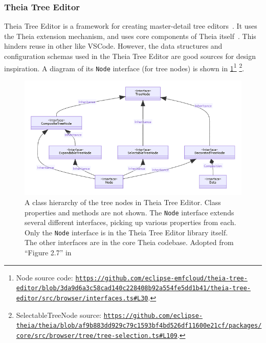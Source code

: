\subsubsection{Theia Tree Editor}\label{par:theia-tree-editor}
Theia Tree Editor is a framework for creating master-detail tree editors~\cite{foundationEMFCloud}.
It uses the Theia extension mechanism, and uses core components of \gls{Theia} itself~\cite{rekstadModelingEnvironmentCloud2020}.
This hinders reuse in other  like \gls{VSCode}.
However, the data structures and configuration schemas used in the Theia Tree Editor are good sources for design inspiration.
A diagram of its \texttt{Node} interface (for tree nodes) is shown in \cref{fig:theia-tree-editor-nodes}\footnote{Node source code: \href{https://github.com/eclipse-emfcloud/theia-tree-editor/blob/3da9d6a3c58cad140c228408b92a554fe5dd1b41/theia-tree-editor/src/browser/interfaces.ts\#L30}{\nolinkurl{https://github.com/eclipse-emfcloud/theia-tree-editor/blob/3da9d6a3c58cad140c228408b92a554fe5dd1b41/theia-tree-editor/src/browser/interfaces.ts\#L30}}.}
\footnote{SelectableTreeNode source: \href{https://github.com/eclipse-theia/theia/blob/af9b883dd929c79c1593bf4bd526df11600e21cf/packages/core/src/browser/tree/tree-selection.ts\#L109}{\nolinkurl{https://github.com/eclipse-theia/theia/blob/af9b883dd929c79c1593bf4bd526df11600e21cf/packages/core/src/browser/tree/tree-selection.ts\#L109}}.}.


\begin{figure}[htbp]  %
  \centering
  \includegraphics[width=\textwidth]{figures/pre-project/theia-tree-editor-node.png}
  \caption[Class Hierarchy of Theia Tree Editor Nodes]{A class hierarchy of the tree nodes in Theia Tree Editor. Class properties and methods are not shown. The \texttt{Node} interface extends several different interfaces, picking up various properties from each. Only the \texttt{Node} interface is in the Theia Tree Editor library itself. The other interfaces are in the core \gls{Theia} codebase. Adopted from ``Figure 2.7'' in \cite[p.~15]{rekstadModelingEnvironmentCloud2020}}\label{fig:theia-tree-editor-nodes}
\end{figure}

